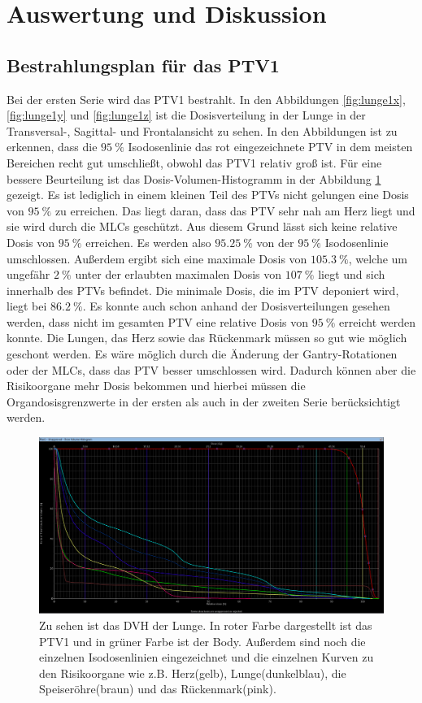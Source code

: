 \section{Auswertung und Diskussion}
\label{sec:AuswertungDiskussion}

\subsection{Bestrahlungsplan für das PTV1}
Bei der ersten Serie wird das PTV1 bestrahlt. In den Abbildungen \ref{fig:lunge1x}, \ref{fig:lunge1y} und \ref{fig:lunge1z} ist die Dosisverteilung in der Lunge in der
Transversal-, Sagittal- und Frontalansicht zu sehen. In den Abbildungen ist zu erkennen, dass die $\SI{95}{\percent}$ Isodosenlinie das
rot eingezeichnete PTV in dem meisten Bereichen recht gut umschließt, obwohl das PTV1 relativ groß ist.
Für eine bessere Beurteilung ist das Dosis-Volumen-Histogramm in der Abbildung \ref{fig:lunge1dvh} gezeigt. 
Es ist lediglich in einem kleinen Teil des PTVs nicht gelungen eine Dosis von $\SI{95}{\percent}$ zu erreichen. Das liegt daran, dass das PTV sehr nah am Herz liegt und sie wird durch die MLCs geschützt. Aus diesem Grund lässt sich keine relative Dosis von $\SI{95}{\percent}$ erreichen. Es werden also $\SI{95,25}{\percent}$ von der $\SI{95}{\percent}$ Isodosenlinie umschlossen.
Außerdem ergibt sich eine maximale Dosis von $\SI{105.3}{\percent}$, welche um ungefähr $\SI{2}{\percent}$ unter der erlaubten maximalen Dosis von $\SI{107}{\percent}$ liegt und sich innerhalb des PTVs befindet. Die minimale Dosis, die im PTV deponiert wird, liegt bei $\SI{86.2}{\percent}$.
Es konnte auch schon anhand der Dosisverteilungen gesehen werden, dass nicht im gesamten PTV eine relative Dosis von $\SI{95}{\percent}$ erreicht werden konnte. Die Lungen, das Herz sowie das Rückenmark müssen so gut wie möglich geschont werden.
Es wäre möglich durch die Änderung der Gantry-Rotationen oder der MLCs, dass das PTV besser umschlossen wird. Dadurch können aber die Risikoorgane mehr Dosis bekommen und hierbei müssen die Organdosisgrenzwerte in der ersten als auch in der zweiten Serie berücksichtigt werden.

\begin{figure}
	\centering
	\includegraphics[width=0.9\linewidth]{../../Bilder/Lunge1_DVH}
	\caption{Zu sehen ist das DVH der Lunge. In roter Farbe dargestellt ist das PTV1 und in grüner Farbe ist der Body. Außerdem sind noch die einzelnen Isodosenlinien eingezeichnet und die einzelnen Kurven zu den Risikoorgane wie z.B. Herz(gelb), Lunge(dunkelblau), die Speiseröhre(braun) und das Rückenmark(pink).}
	\label{fig:lunge1dvh}
\end{figure}

